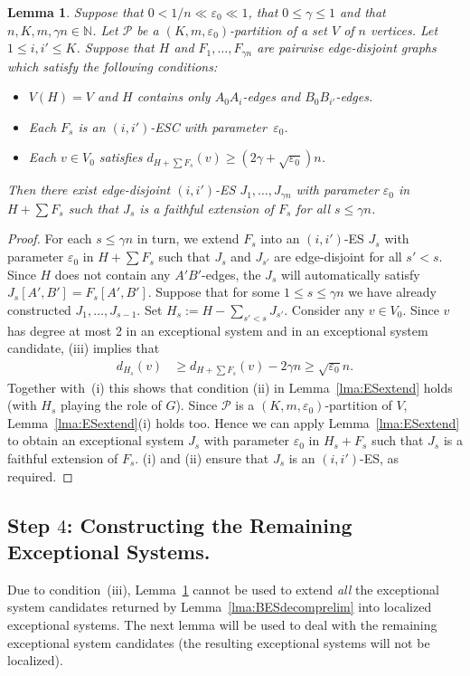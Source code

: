 \documentclass{memo-l}
\newtheorem{lemma}[firstthm]{Lemma}
\def\cP{\mathcal{P}}
\def\eps{\varepsilon}
\def\epszero{\eps_0}
\numberwithin{section}{chapter}
\numberwithin{equation}{section}
\numberwithin{firstthm}{section}
\numberwithin{figure}{section}
\begin{document}
{\begin{lemma} \label{lma:BESextend2}
Suppose that $0 <  1/n  \ll \epszero \ll   1$, that $0 \le \gamma \le 1$ and that $n, K, m, \gamma n \in \mathbb{N}$.
Let $\mathcal{P}$ be a $(K, m , \epszero)$-partition of a set $V$ of $n$ vertices.
Let $1\le i,i'\le K$.
Suppose that $H$ and $F_1, \dots ,F_{\gamma n}$ are pairwise edge-disjoint graphs which satisfy the following conditions:
\begin{itemize}
\item[\rm (i)] $V(H)=V$ and $H$ contains only $A_0A_i$-edges and $B_0B_{i'}$-edges.
\item[\rm (ii)] Each $F_s$ is an $(i,i')$-ESC with parameter~$\eps_0$.
\item[\rm (iii)] Each $v \in V_0$ satisfies $d_{H+\sum F_s}(v )  \ge (2 \gamma  +\sqrt{\epszero} )n$.
\end{itemize}
Then there exist edge-disjoint $(i,i')$-ES $J_1, \dots ,J_{\gamma n }$ with parameter $\eps_0$ in $H +\sum F_s$ 
such that $J_s$ is a faithful extension of $F_s$
for all $s \le \gamma n$. 
\end{lemma}
\begin{proof}
For each $s \le \gamma n$ in turn, we extend $F_s$ into an $(i,i')$-ES $J_s$ with parameter $\eps_0$ in $H+\sum F_s$ such that
$J_s$ and $J_{s'}$ are edge-disjoint for all $s' < s$.
Since $H$ does not contain any $A'B'$-edges, the $J_s$ will automatically satisfy $J_s[A',B'] = F_s[A',B']$.
Suppose that for some $1\le s\le \gamma n$ we have already constructed $J_1, \dots ,J_{s-1}$.
Set $H_s := H - \sum_{s' < s} J_{s'}$. 
Consider any $v \in V_0$.
Since $v$ has degree at most 2 in an exceptional system and in an exceptional system candidate, (iii) implies that
\begin{align*}
	d_{H_s}(v) & \ge d_{H+ \sum F_s}(v) - 2 \gamma n \ge \sqrt{\epszero} n.
\end{align*}
Together with~(i) this shows that condition (ii) in Lemma~\ref{lma:ESextend} holds (with $H_s$ playing the role of $G$).
Since $\cP$ is a $(K,m,\eps_0)$-partition of $V$, Lemma~\ref{lma:ESextend}(i) holds too.
Hence we can apply Lemma~\ref{lma:ESextend} to obtain an exceptional system $J_s$ with parameter $\eps_0$ in $H_s + F_s$
such that $J_s$ is a faithful extension of $F_s$. (i) and (ii) ensure that $J_s$ is an $ (i,i')$-ES, as required.
\end{proof}





\subsection{Step $4$: Constructing the Remaining Exceptional Systems.}
Due to condition~(iii), Lemma~\ref{lma:BESextend2} cannot be used to extend \emph{all} the exceptional system candidates
returned by Lemma~\ref{lma:BESdecomprelim} into localized exceptional systems.
The next lemma will be used to deal with the remaining exceptional system candidates
(the resulting exceptional systems will not be localized).

}
\end{document}
